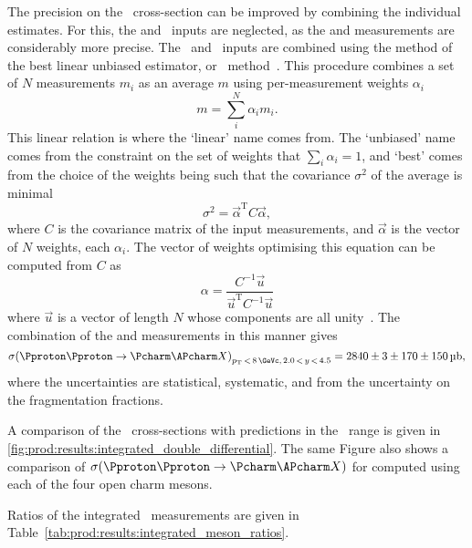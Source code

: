 The precision on the \ccbar\ cross-section can be improved by combining the 
individual estimates.
For this, the \PDsplus and \PDstarp\ inputs are neglected, as the \PDzero and 
\PDplus measurements are considerably more precise.
The \PDzero\ and \PDplus\ inputs are combined using the method of the best 
linear unbiased estimator, or \blue\ method~\cite{Lyons:1988rp}.
This procedure combines a set of $N$ measurements $m_{i}$ as an average $m$ 
using per-measurement weights $\alpha_{i}$
\begin{equation}
  m = \sum_{i}^{N} \alpha_{i}m_{i}.
  \label{eqn:results:blue}
\end{equation}
This linear relation is where the `linear' name comes from.
The `unbiased' name comes from the constraint on the set of weights that 
$\sum_{i}\alpha_{i} = 1$, and `best' comes from the choice of the weights being 
such that the covariance $\sigma^{2}$ of the average is minimal
\begin{equation}
  \sigma^{2} = \vec{\alpha}^{\text{T}}C\vec{\alpha},
  \label{eqn:results:blue_variance}
\end{equation}
where $C$ is the covariance matrix of the input measurements, and 
$\vec{\alpha}$ is the vector of $N$ weights, each $\alpha_{i}$.
The vector of weights optimising this equation can be computed from $C$ as
\begin{equation}
  \alpha = \frac{C^{-1}\vec{u}}{\vec{u}^{\text{T}}C^{-1}\vec{u}}
  \label{eqn:results:blue_weights}
\end{equation}
where $\vec{u}$ is a vector of length $N$ whose components are all 
unity~\cite{Lyons:1988rp}.
The combination of the \PDzero and \PDplus measurements in this manner gives
\begin{equation*}
  \xsec{(\ppToccbarX)}_{\pT\,<\,8\,\si{\GeVc},\,2.0\,<\,y\,<\,4.5} =
    \SI[parse-numbers=false]{2840 \pm 3 \pm 170 \pm 150}{\micro\barn},
\end{equation*}
where the uncertainties are statistical, systematic, and from the uncertainty 
on the fragmentation fractions.

A comparison of the \ccbar\ cross-sections with predictions in the \pT\ range 
 is given in 
\cref{fig:prod:results:integrated_double_differential}.
The same Figure also shows a comparison of $\xsec(\ppToccbarX)$ for 
 computed using each of the four open charm mesons.

Ratios of the integrated \xsectimesbfrac\ measurements are given in 
Table~\ref{tab:prod:results:integrated_meson_ratios}.

